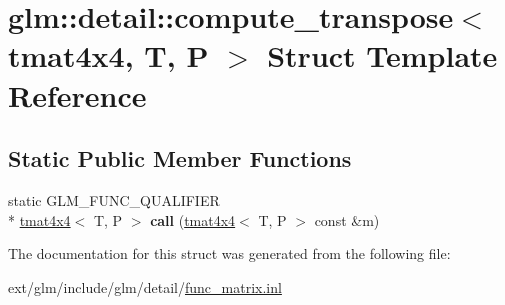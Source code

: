 \hypertarget{structglm_1_1detail_1_1compute__transpose_3_01tmat4x4_00_01_t_00_01_p_01_4}{\section{glm\-:\-:detail\-:\-:compute\-\_\-transpose$<$ tmat4x4, T, P $>$ Struct Template Reference}
\label{structglm_1_1detail_1_1compute__transpose_3_01tmat4x4_00_01_t_00_01_p_01_4}
}
\subsection*{Static Public Member Functions}
\begin{DoxyCompactItemize}
\item 
\hypertarget{structglm_1_1detail_1_1compute__transpose_3_01tmat4x4_00_01_t_00_01_p_01_4_a9f85b05d5a5d934934c923f8ac9f0663}{static G\-L\-M\-\_\-\-F\-U\-N\-C\-\_\-\-Q\-U\-A\-L\-I\-F\-I\-E\-R \\*
\hyperlink{structglm_1_1tmat4x4}{tmat4x4}$<$ T, P $>$ {\bfseries call} (\hyperlink{structglm_1_1tmat4x4}{tmat4x4}$<$ T, P $>$ const \&m)}\label{structglm_1_1detail_1_1compute__transpose_3_01tmat4x4_00_01_t_00_01_p_01_4_a9f85b05d5a5d934934c923f8ac9f0663}

\end{DoxyCompactItemize}


The documentation for this struct was generated from the following file\-:\begin{DoxyCompactItemize}
\item 
ext/glm/include/glm/detail/\hyperlink{func__matrix_8inl}{func\-\_\-matrix.\-inl}\end{DoxyCompactItemize}
